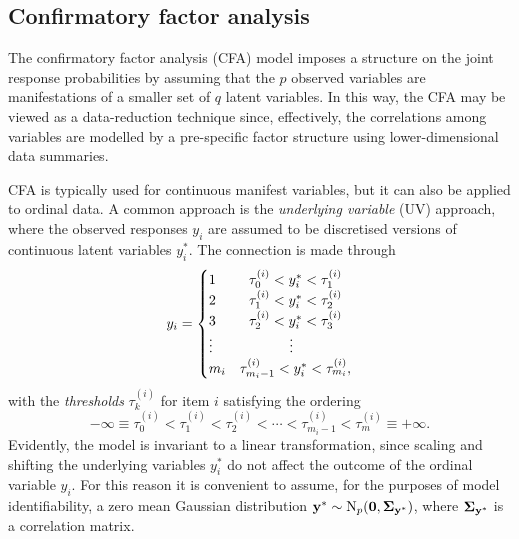 \documentclass[
  letterpaper,
  DIV=11,
  numbers=noendperiod]{scrartcl}
\begin{document}
\subsection{Confirmatory factor
analysis}\label{confirmatory-factor-analysis}

The confirmatory factor analysis (CFA) model imposes a structure on the
joint response probabilities by assuming that the \(p\) observed
variables are manifestations of a smaller set of \(q\) latent variables.
In this way, the CFA may be viewed as a data-reduction technique since,
effectively, the correlations among variables are modelled by a
pre-specific factor structure using lower-dimensional data summaries.

CFA is typically used for continuous manifest variables, but it can also
be applied to ordinal data. A common approach is the \emph{underlying
variable} (UV) approach, where the observed responses \(y_i\) are
assumed to be discretised versions of continuous latent variables
\(y_i^*\). The connection is made through \[
y_i = \begin{cases}
1 & \ \ \tau_0^{(i)} < y^*_i < \tau_1^{(i)} \\
2 &  \ \ \tau_{1}^{(i)} <  y^*_i < \tau_2^{(i)} \\
3 &  \ \ \tau_{2}^{(i)} <  y^*_i < \tau_3^{(i)} \\
\vdots &  \hphantom{\tau_{1}^{(i)} \leq \ \ \ } \vdots \\
m_i & \tau_{m_i-1}^{(i)} < y^*_i < \tau_{m_i}^{(i)},
\end{cases}
\] with the \emph{thresholds} \(\tau_k^{(i)}\) for item \(i\) satisfying
the ordering \[
-\infty \equiv \tau_0^{(i)} < \tau_1^{(i)} < \tau_2^{(i)} < \cdots < \tau_{m_i-1}^{(i)} < \tau_m^{(i)} \equiv +\infty.
\] Evidently, the model is invariant to a linear transformation, since
scaling and shifting the underlying variables \(y_i^*\) do not affect
the outcome of the ordinal variable \(y_i\). For this reason it is
convenient to assume, for the purposes of model identifiability, a zero
mean Gaussian distribution \({\mathbf y}^* \sim \operatorname{N}_p({\mathbf 0},{\boldsymbol\Sigma}_{{\mathbf y}^*})\),
where \({\boldsymbol\Sigma}_{{\mathbf y}^*}\) is a correlation matrix.
\end{document}
